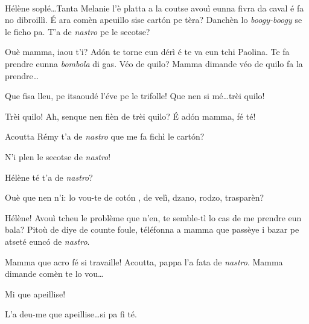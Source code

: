 \begin{drama}
\Cesarspeaks {}\\ Hélène soplé\ldots Tanta Melanie l’è platta a la coutse avouì eunna fivra da caval é fa no dibroillì.  É ara comèn apeuillo sise cart\'on pe tèra? Danchèn lo \textit{boogy-boogy} se le ficho pa.  T’a de \textit{nastro} pe le secotse?


\Remyspeaks Ouè mamma, iaou t'i? Ad\'on te torne eun dérì é te va eun tchi Paolina. Te fa prendre eunna \textit{bombola} di gas. Véo de quilo?  Mamma dimande véo de quilo fa la prendre\ldots

\Cesarspeaks{} Que fisa lleu, pe itsaoudé l'éve pe le trifolle! Que nen si mé\ldots trèi quilo!

\Remyspeaks {} Trèi quilo! Ah, senque nen fièn de trèi quilo? É ad\'on mamma, fé té!


\Cesarspeaks{}	Acoutta Rémy t'a de \textit{nastro} que me fa fichì le cart\'on?

\Remyspeaks{} N'i plen le secotse de \textit{nastro}! 

\Cesarspeaks {} Hélène té t'a de \textit{nastro}?

\Helenespeaks  {} Ouè que nen n'i: lo vou-te de cot\'on , de velì, dzano, rodzo, trasparèn?

\Cesarspeaks{} Hélène! Avouì tcheu le problème que n'en, te semble-tì lo cas de me prendre eun bala? Pitoù de diye de counte foule,  téléfonna a mamma que passèye i bazar pe atseté eunc\'o de \textit{nastro}.


\Helenespeaks Mamma que acro fé si travaille! Acoutta, pappa l'a fata de \textit{nastro}.  Mamma dimande comèn te lo vou\ldots

\Cesarspeaks{} Mi que apeillise!

\Helenespeaks {} L'a deu-me que apeillise\ldots si pa fi té.



\end{drama}
